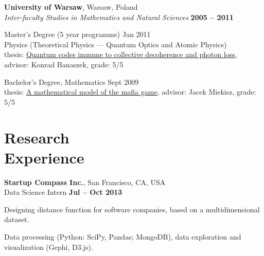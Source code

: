 \documentclass[margin,line]{resume}
\begin{document}
\begin{resume}
    {\bf University of Warsaw}, Warsaw, Poland \\
    {\sl Inter-faculty Studies in Mathematics and Natural Sciences} \hfill {\bf 2005 -- 2011}\\
    \begin{list2}
      \vspace*{-4mm}
      \item Master's Degree  (5 year programme) {\hfill Jan 2011}\\
      Physics (Theoretical Physics --- Quantum Optics and Atomic Physics)\\
      thesis: \href{http://migdal.wikidot.com/en:collective-decoherence}{Quantum codes immune to collective decoherence and photon loss},\\
      advisor: Konrad Banaszek, grade: 5/5
      \item Bachelor's Degree, Mathematics \hfill Sept 2009\\
      thesis: \href{http://migdal.wikidot.com/en:mafia}{A mathematical model of the mafia game}, advisor: Jacek Miekisz, grade: 5/5
    \end{list2}
    

\newpage

    \section{\mysidestyle Research\\Experience}

    {\bf  Startup Compass Inc.}, San Francisco, CA, USA\\
    Data Science Intern \hfill {\bf Jul -- Oct 2013}\\
    \begin{list2}
        \vspace*{-4mm}
        \item Designing distance function for software companies, based on a multidimensional dataset.
        \item Data processing (Python: SciPy, Pandas; MongoDB), data exploration and visualization (Gephi, D3.js).
    \end{list2}


\end{resume}
\end{document}
